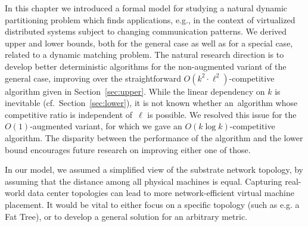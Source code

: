 
In this chapter we introduced a formal model for studying a natural dynamic partitioning problem which
finds applications, e.g., in the context of virtualized distributed systems
subject to changing communication patterns. We derived upper and lower bounds,
both for the general case as well as for a special case, related to a dynamic
matching problem. The natural research direction is to develop better
deterministic algorithms for the non-augmented variant of the general case,
improving over the straightforward $O(k^2 \cdot \ell^2)$-competitive algorithm
given in Section~\ref{sec:upper}. While the linear dependency on $k$ is
inevitable (cf.~Section~\ref{sec:lower}), it is not known whether
an~algorithm whose competitive ratio is independent of~$\ell$ is possible. We
resolved this issue for the $O(1)$-augmented variant, for which we gave an
$O(k \log k)$-competitive algorithm.
The disparity between the performance of the algorithm and the lower bound encourages future research on improving either one of those.

In our model, we assumed a simplified view of the substrate network topology, by assuming that the distance among all physical machines is equal.
Capturing real-world data center topologies can lead to more network-efficient virtual machine placement.
It would be vital to either focus on a specific topology (such as e.g. a Fat Tree), or to develop a general solution for an arbitrary metric.
